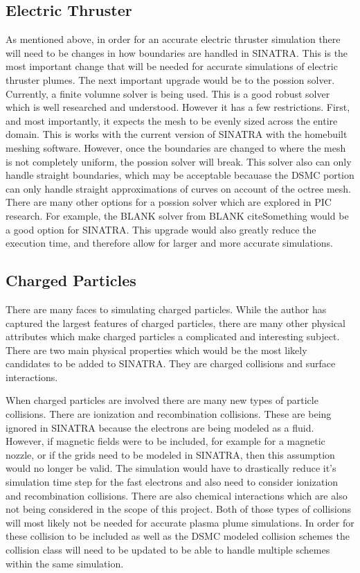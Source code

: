 \subsection{Electric Thruster}

As mentioned above, in order for an accurate electric thruster simulation there will need to be changes in how boundaries are handled in SINATRA. This is the most important change that will be needed for accurate simulations of electric thruster plumes. The next important upgrade would be to the possion solver. Currently, a finite volumne solver is being used. This is a good robust solver which is well researched and understood. However it has a few restrictions. First, and most importantly, it expects the mesh to be evenly sized across the entire domain. This is works with the current version of SINATRA with the homebuilt meshing software. However, once the boundaries are changed to where the mesh is not completely uniform, the possion solver will break. This solver also can only handle straight boundaries, which may be acceptable becauase the DSMC portion can only handle straight approximations of curves on account of the octree mesh. There are many other options for a possion solver which are explored in PIC research. For example, the BLANK solver from BLANK cite{Something} would be a good option for SINATRA. This upgrade would also greatly reduce the execution time, and therefore allow for larger and more accurate simulations. \par


\subsection{Charged Particles}

There are many faces to simulating charged particles. While the author has captured the largest features of charged particles, there are many other physical attributes which make charged particles a complicated and interesting subject. There are two main physical properties which would be the most likely candidates to be added to SINATRA. They are charged collisions and surface interactions. \par

\indent When charged particles are involved there are many new types of particle collisions. There are ionization and recombination collisions. These are being ignored in SINATRA because the electrons are being modeled as a fluid. However, if magnetic fields were to be included, for example for a magnetic nozzle, or if the grids need to be modeled in SINATRA, then this assumption would no longer be valid. The simulation would have to drastically reduce it's simulation time step for the fast electrons and also need to consider ionization and recombination collisions. There are also chemical interactions which are also not being considered in the scope of this project. Both of those types of collisions will most likely not be needed for accurate plasma plume simulations. In order for these collision to be included as well as the DSMC modeled collision schemes the collision class will need to be updated to be able to handle multiple schemes within the same simulation. \par

